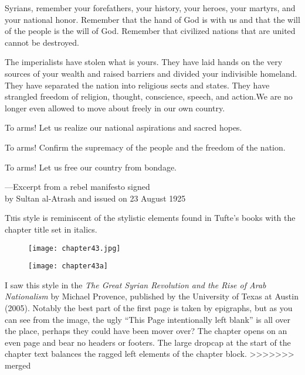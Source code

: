 \epigraph{Syrians, remember your forefathers, your history, your heroes, your
martyrs, and your national honor. Remember that the hand of God is
with us and that the will of the people is the will of God. Remember
that civilized nations that are united cannot be destroyed.

The imperialists have stolen what is yours. They have laid hands on
the very sources of your wealth and raised barriers and divided your
indivisible homeland. They have separated the nation into religious
sects and states. They have strangled freedom of religion, thought,
conscience, speech, and action.We are no longer even allowed to move
about freely in our own country.

To arms! Let us realize our national aspirations and sacred hopes.

To arms! Confirm the supremacy of the people and the freedom of
the nation.

To arms! Let us free our country from bondage.}{---Excerpt from a rebel manifesto signed\\ by Sultan
al-Atrash and issued on 23 August 1925}

\lettrine{T}his style is reminiscent of the stylistic elements found in Tufte's books with the chapter title set in italics.
\begin{figure}[ht]
\centering
\texttt{[image: chapter43.jpg]}\par
\texttt{[image: chapter43a]}
\end{figure}
I saw this style in the \textit{The Great Syrian Revolution and the Rise of Arab Nationalism} by Michael Provence, published by the University of Texas at Austin (2005). Notably the best part of the first page is taken by epigraphs, but as you can see from the image, the ugly ``This Page intentionally left blank'' is all over the place, perhaps they could have been mover over? The chapter opens on an even page and bear no headers or footers. The large dropcap at the start of the chapter text balances the ragged left elements of the chapter block.
\lipsum
>>>>>>> merged
